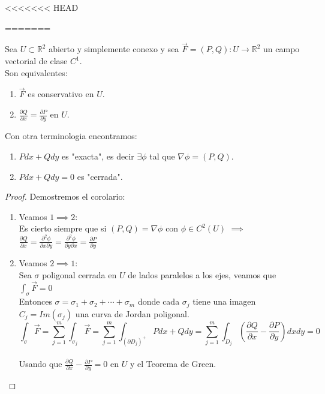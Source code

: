 
<<<<<<< HEAD


=======
\begin{corolario}
    Sea $U \subset \mathbb{R}^2$ abierto y simplemente conexo y sea $\vec{F} = (P, Q): U \to \mathbb{R}^2$ un campo vectorial de clase $C^1$.\\
    Son equivalentes:\\
    \begin{enumerate}
        \item $\vec{F}$ es conservativo en $U$.
        \item $\frac{\partial Q}{\partial x} = \frac{\partial P}{\partial y}$ en $U$.
    \end{enumerate}
    Con otra terminologia encontramos:
    \begin{enumerate}
        \item $Pdx + Qdy$ es "exacta", es decir $\exists \phi$ tal que $\nabla \phi = (P,Q)$.
        \item $Pdx + Qdy = 0$ es "cerrada".
    \end{enumerate}
\end{corolario}

\begin{proof}
    Demostremos el corolario:\\
    \begin{enumerate}
        \item Veamos $1 \implies 2$:\\
        Es cierto siempre que si $(P,Q) = \nabla \phi$ con $\phi \in C^2(U)$ $\implies$ $\frac{\partial Q}{\partial x} = \frac{\partial^2 \phi}{\partial x \partial y} = \frac{\partial^2 \phi}{\partial y \partial x} = \frac{\partial P}{\partial y}$\\
        \item Veamos $2 \implies 1$:\\
        Sea $\sigma$ poligonal cerrada en $U$ de lados paralelos a los ejes, veamos que $\int_{\sigma} \vec{F} = 0$\\
        Entonces $\sigma = \sigma_1 + \sigma_2 + \cdots + \sigma_m$ donde cada $\sigma_j$ tiene una imagen $C_j = Im(\sigma_j)$ una curva de Jordan poligonal.\\
        $$\int_{\sigma} \vec{F} = \sum_{j=1}^{m} \int_{\sigma_j} \vec{F} = \sum_{j=1}^{m} \int_{\left(\partial D_j \right)^+} Pdx + Qdy = \sum_{j=1}^{m} \int_{D_j} \left( \frac{\partial Q}{\partial x} - \frac{\partial P}{\partial y} \right) dxdy = 0$$ \\
        Usando que $\frac{\partial Q}{\partial x} - \frac{\partial P}{\partial y} = 0$ en $U$ y el Teorema de Green.\\
    \end{enumerate}
\end{proof}

